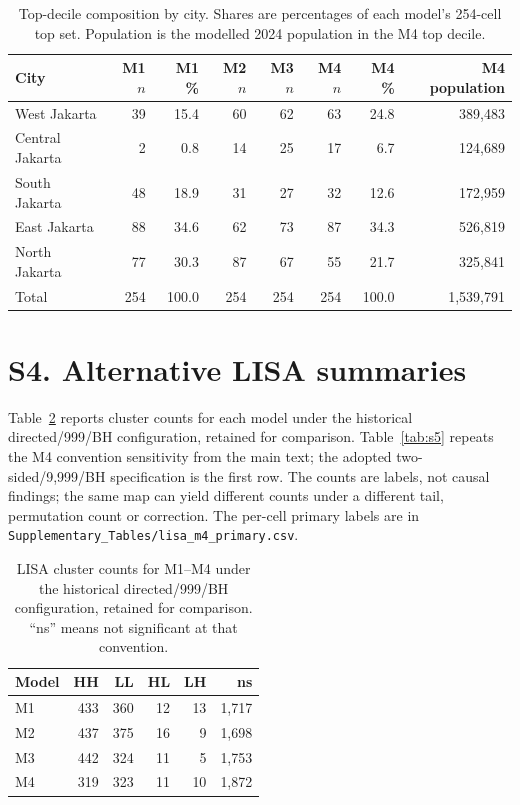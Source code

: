 \documentclass[times,twoside]{_Templates/MultiTargetManuscript}
\begin{document}
\begin{table}[H]
\centering
\small
\caption{Top-decile composition by city. Shares are percentages of each model's
254-cell top set. Population is the modelled 2024 population in the M4 top
decile.}
\label{tab:s3}
\begin{tabular}{@{}lrrrrrrr@{}}
\toprule
City & M1 $n$ & M1 \% & M2 $n$ & M3 $n$ & M4 $n$ & M4 \% & M4 population \\
\midrule
West Jakarta & 39 & 15.4 & 60 & 62 & 63 & 24.8 & 389,483 \\
Central Jakarta & 2 & 0.8 & 14 & 25 & 17 & 6.7 & 124,689 \\
South Jakarta & 48 & 18.9 & 31 & 27 & 32 & 12.6 & 172,959 \\
East Jakarta & 88 & 34.6 & 62 & 73 & 87 & 34.3 & 526,819 \\
North Jakarta & 77 & 30.3 & 87 & 67 & 55 & 21.7 & 325,841 \\
\midrule
Total & 254 & 100.0 & 254 & 254 & 254 & 100.0 & 1,539,791 \\
\bottomrule
\end{tabular}
\end{table}

\section*{S4. Alternative LISA summaries}

Table~\ref{tab:s4} reports cluster counts for each model under the historical
directed/999/BH configuration, retained for comparison. Table~\ref{tab:s5}
repeats the M4 convention sensitivity from the main text; the adopted
two-sided/9,999/BH specification is the first row. The counts are labels, not
causal findings; the same map can yield different counts under a different
tail, permutation count or correction. The per-cell primary labels are in
\texttt{Supplementary\_Tables/lisa\_m4\_primary.csv}.

\begin{table}[H]
\centering
\small
\caption{LISA cluster counts for M1--M4 under the historical directed/999/BH
configuration, retained for comparison. ``ns'' means not significant at that
convention.}
\label{tab:s4}
\begin{tabular}{@{}lrrrrr@{}}
\toprule
Model & HH & LL & HL & LH & ns \\
\midrule
M1 & 433 & 360 & 12 & 13 & 1,717 \\
M2 & 437 & 375 & 16 & 9 & 1,698 \\
M3 & 442 & 324 & 11 & 5 & 1,753 \\
M4 & 319 & 323 & 11 & 10 & 1,872 \\
\bottomrule
\end{tabular}
\end{table}
\end{document}
